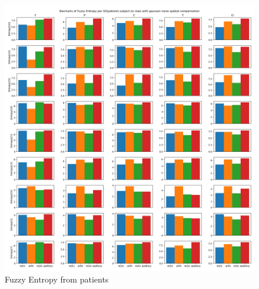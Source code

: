 \documentclass[10pt]{article}
\begin{document}
\begin{figure}[H]
  \includegraphics[width=16cm]{../../../data_analysis_results/FuzzEnt/Patient/all-fuzzyEntr.png}
  \caption{Fuzzy Entropy from patients}
  \label{fig:patientFuzzEnt}
\end{figure}
\end{document}
